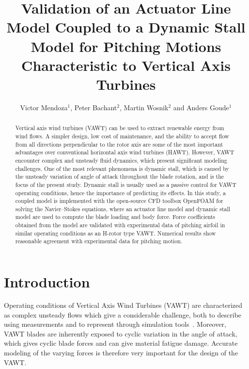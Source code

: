 \documentclass[a4paper]{jpconf}
\begin{document}
\title{Validation of an Actuator Line Model Coupled to a Dynamic Stall Model for
Pitching Motions Characteristic to Vertical Axis Turbines}


\author{Victor Mendoza$^{1}$, Peter Bachant$^{2}$, Martin Wosnik$^{2}$ and Anders Goude$^{1}$ }
\address{$^{1}$ Department of Engineering Sciences, Division of Electricity, Uppsala University, \\Uppsala 751 21, Sweden}
\address{$^{2}$ Center for Ocean Renewable Energy, University of New Hampshire, 24 Colovos Rd.,\\ Durham, NH 03824, USA}

\begin{abstract}
    Vertical axis wind turbines (VAWT) can be used to extract renewable energy from
    wind flows. A simpler design, low cost of maintenance, and the
    ability to accept flow from all directions perpendicular to the rotor axis
    are some of the most important advantages over conventional horizontal axis wind
    turbines (HAWT). However, VAWT encounter complex and unsteady fluid
    dynamics, which present significant modeling challenges. One of the most
    relevant phenomena is dynamic stall, which is caused by the unsteady
    variation of angle of attack throughout the blade rotation, and is the focus
    of the present study. Dynamic stall is usually used as a passive control for
    VAWT operating conditions, hence the importance of predicting its effects. In
    this study, a coupled model is implemented with the open-source CFD
    toolbox OpenFOAM for solving the Navier--Stokes equations, where an actuator
    line model and dynamic stall model are used to compute the blade loading and
    body force. Force coefficients obtained from the model are validated with
    experimental data of pitching airfoil in similar operating conditions as an
    H-rotor type VAWT. Numerical results show reasonable agreement with
    experimental data for pitching motion.
\end{abstract}

\section{Introduction}

Operating conditions of Vertical Axis Wind Turbines (VAWT) are characterized as
complex unsteady flows which give a considerable challenge, both to describe
using measurements and to represent through simulation
tools~\cite{huyer1996unsteady}. Moreover, VAWT blades are inherently exposed to
cyclic variation in the angle of attack, which gives cyclic blade forces and can
give material fatigue damage. Accurate modeling of the varying forces is
therefore very important for the design of the VAWT.
\end{document}
